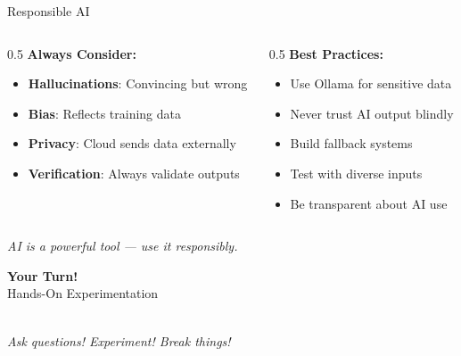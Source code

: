 \documentclass[aspectratio=169,12pt]{beamer}
\begin{document}
\begin{frame}{Responsible AI}
\begin{columns}
\begin{column}{0.5\textwidth}
\textbf{Always Consider:}
\begin{itemize}
\item \textbf{Hallucinations}: Convincing but wrong
\item \textbf{Bias}: Reflects training data
\item \textbf{Privacy}: Cloud sends data externally
\item \textbf{Verification}: Always validate outputs
\end{itemize}
\end{column}
\begin{column}{0.5\textwidth}
\textbf{Best Practices:}
\begin{itemize}
\item Use Ollama for sensitive data
\item Never trust AI output blindly
\item Build fallback systems
\item Test with diverse inputs
\item Be transparent about AI use
\end{itemize}
\end{column}
\end{columns}
\vspace{0.3cm}
\begin{center}
\textit{AI is a powerful tool --- use it responsibly.}
\end{center}
\end{frame}

\begin{frame}[plain]
\begin{center}
\vspace{1.5cm}
{\Huge\textcolor{ubuntuorange}{\textbf{Your Turn!}}}\\[0.4cm]
{\LARGE Hands-On Experimentation}\\[0.5cm]
\\[0.4cm]
\textit{Ask questions! Experiment! Break things!}
\end{center}
\end{frame}
\end{document}
